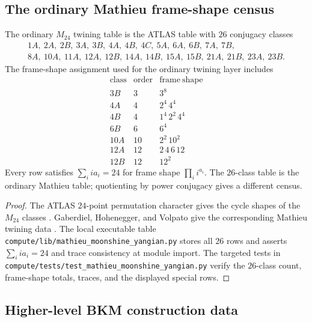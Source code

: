 \subsection{The ordinary Mathieu frame-shape census}
\label{subsec:lorgat-conjecture-one-mathieu-census}

\begin{proposition}
\label{prop:lorgat-conjecture-one-mathieu-census}
The ordinary \(M_{24}\) twining table is the ATLAS table with \(26\)
conjugacy classes
\[
\begin{gathered}
1A,\ 2A,\ 2B,\ 3A,\ 3B,\ 4A,\ 4B,\ 4C,\ 5A,\ 6A,\ 6B,\ 7A,\ 7B,\\
8A,\ 10A,\ 11A,\ 12A,\ 12B,\ 14A,\ 14B,\ 15A,\ 15B,\ 21A,\ 21B,\ 23A,\ 23B.
\end{gathered}
\]
The frame-shape assignment used for the ordinary twining layer includes
\[
\begin{array}{c|c|c}
\mathrm{class} & \mathrm{order} & \mathrm{frame\ shape} \\ \hline
3B & 3 & 3^8 \\
4A & 4 & 2^4\,4^4 \\
4B & 4 & 1^4\,2^2\,4^4 \\
6B & 6 & 6^4 \\
10A & 10 & 2^2\,10^2 \\
12A & 12 & 2\,4\,6\,12 \\
12B & 12 & 12^2
\end{array}
\]
Every row satisfies \(\sum_i i a_i=24\) for frame shape
\(\prod_i i^{a_i}\). The \(26\)-class table is the ordinary Mathieu
table; quotienting by power conjugacy gives a different census.
\end{proposition}

\begin{proof}
The ATLAS \(24\)-point permutation character gives the cycle shapes of
the \(M_{24}\) classes \cite{ConwayCurtisNortonParkerWilson1985}.
Gaberdiel, Hohenegger, and Volpato give the corresponding Mathieu
twining data \cite{GaberdielHoheneggerVolpato2010}. The local executable
table \texttt{compute/lib/mathieu\_moonshine\_yangian.py} stores all
\(26\) rows and asserts \(\sum_i i a_i=24\) and trace consistency at
module import. The targeted tests in
\texttt{compute/tests/test\_mathieu\_moonshine\_yangian.py} verify the
\(26\)-class count, frame-shape totals, traces, and the displayed
special rows.
\end{proof}

\subsection{Higher-level BKM construction data}
\label{subsec:lorgat-conjecture-one-higher-level-data}


